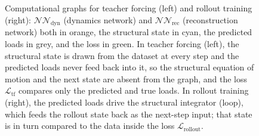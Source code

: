 \begin{figure}[t]
\caption{Computational graphs for teacher forcing (left) and rollout training (right):
$\mathcal{NN}_\mathrm{dyn}$ (dynamics network) and $\mathcal{NN}_\mathrm{rec}$ (reconstruction
network) both in orange, the structural state in cyan, the predicted loads in grey, and the loss
in green. In teacher forcing (left), the structural state is drawn from the dataset
at every step and the predicted loads never feed back into it, so the structural equation of
motion and the next state are absent from the graph, and the loss $\mathcal{L}_\mathrm{tf}$
compares only the predicted and true loads. In rollout training (right), the predicted
loads drive the structural integrator (loop), which feeds the rollout state back as
the next-step input; that state is in turn compared to the data inside the loss $\mathcal{L}_\mathrm{rollout}$.}
\label{fig:tf_vs_rollout}
\end{figure}

